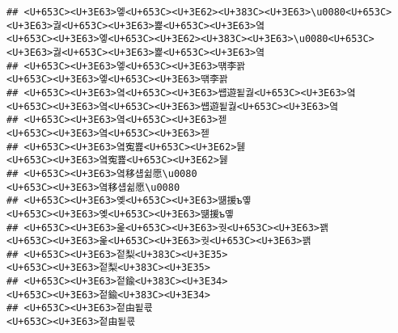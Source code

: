 \documentclass[]{article}
\begin{document}
\begin{verbatim}
## <U+653C><U+3E63>엫<U+653C><U+3E62><U+383C><U+3E63>\u0080<U+653C><U+3E63>궗<U+653C><U+3E63>뾽<U+653C><U+3E63>옄                                                                         <U+653C><U+3E63>엫<U+653C><U+3E62><U+383C><U+3E63>\u0080<U+653C><U+3E63>궗<U+653C><U+3E63>뾽<U+653C><U+3E63>옄
## <U+653C><U+3E63>엫<U+653C><U+3E63>떆李꽑                                                                                                                                                                     <U+653C><U+3E63>엫<U+653C><U+3E63>떆李꽑
## <U+653C><U+3E63>옄<U+653C><U+3E63>썝遊됱궗<U+653C><U+3E63>옄                                                                                                                                         <U+653C><U+3E63>옄<U+653C><U+3E63>썝遊됱궗<U+653C><U+3E63>옄
## <U+653C><U+3E63>옄<U+653C><U+3E63>젣                                                                                                                                                                             <U+653C><U+3E63>옄<U+653C><U+3E63>젣
## <U+653C><U+3E63>옄寃뾾<U+653C><U+3E62>뒗                                                                                                                                                                     <U+653C><U+3E63>옄寃뾾<U+653C><U+3E62>뒗
## <U+653C><U+3E63>옄移섑쉶愿\u0080                                                                                                                                                                         <U+653C><U+3E63>옄移섑쉶愿\u0080
## <U+653C><U+3E63>옞<U+653C><U+3E63>떎援ъ옣                                                                                                                                                                 <U+653C><U+3E63>옞<U+653C><U+3E63>떎援ъ옣
## <U+653C><U+3E63>옱<U+653C><U+3E63>궛<U+653C><U+3E63>꽭                                                                                                                                                     <U+653C><U+3E63>옱<U+653C><U+3E63>궛<U+653C><U+3E63>꽭
## <U+653C><U+3E63>젙梨<U+383C><U+3E35>                                                                                                                                                                             <U+653C><U+3E63>젙梨<U+383C><U+3E35>
## <U+653C><U+3E63>젙鍮<U+383C><U+3E34>                                                                                                                                                                             <U+653C><U+3E63>젙鍮<U+383C><U+3E34>
## <U+653C><U+3E63>젙由됱쿇                                                                                                                                                                                         <U+653C><U+3E63>젙由됱쿇

\end{verbatim}
\end{document}
